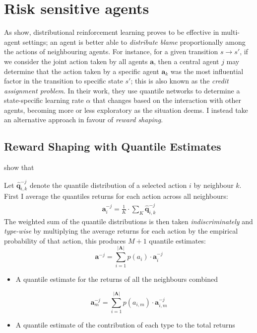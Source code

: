 \section{Risk sensitive agents}
As \cite{Xueguang2018} show, distributional reinforcement learning proves to be effective
in multi-agent settings; an agent is better able to \emph{distribute blame} proportionally
among the actions of neighbouring agents. For instance, for a given transition $s\rightarrow s'$,
if we consider the joint action taken by all agents $\mathbf{a}$, then a central agent $j$ may determine
that the action taken by a specific agent $\mathbf{a}_k$ was the most influential factor in the
transition to specific state $s'$; this is also known as the \emph{credit assignment problem}. In their work, they use quantile networks to determine a state-specific learning rate $\alpha$
that changes based on the interaction with other agents, becoming more or less exploratory
as the situation deems. I instead take an alternative approach in favour of \emph{reward shaping}.

\subsection{Reward Shaping with Quantile Estimates}
\cite{Devlin2014} show that

Let $\mathbf{\hat{q}}^{-j}_{i,k}$ denote the quantile 
distribution of a selected action $i$ by neighbour $k$. First I average the quantiles returns
for each action across all neighbours:
\begin{equation}
    \begin{gathered}
        \mathbf{a}^{-j}_i = \frac{1}{K} \cdot \sum_K  \mathbf{\hat{q}}^{-j}_{i,k}
    \end{gathered}
\end{equation}
The weighted sum of the quantile distributions 
is then taken \emph{indiscriminately} and \emph{type-wise} by multiplying
the average returns for each action by the empirical probability of that action,
this produces $M + 1$ quantile estimates:
\begin{equation}
    \mathbf{a}^{-j} = \sum_{i=1}^{\vert \mathbf{A} \vert} p(a_i) \cdot \mathbf{a}^{-j}_i
\end{equation}
\begin{itemize}
    \item A quantile estimate for the returns of all the neighbours combined
\end{itemize}
\begin{equation}
    \mathbf{a}^{-j}_m =  \sum_{i=1}^{\vert \mathbf{A} \vert} p(a_{i,m}) \cdot \mathbf{a}^{-j}_{i,m}
\end{equation}
\begin{itemize}
    \item A quantile estimate of the contribution of each type to the total returns
\end{itemize}